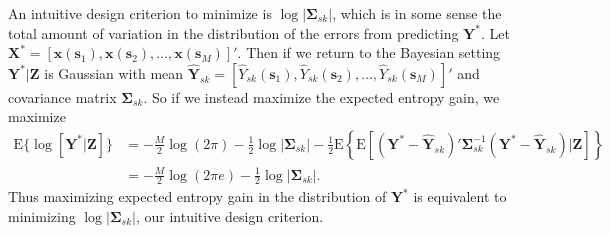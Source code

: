 \documentclass[12pt]{article}
\newcommand{\E}{\mathrm{E}}
\begin{document}
An intuitive design criterion to minimize is $\log|\bm{\Sigma}_{sk}|$, which is in some sense the total amount of variation in the distribution of the errors from predicting $\bm{Y}^*$. Let $\bm{X}^* = [\bm{x}(\bm{s}_1), \bm{x}(\bm{s}_2), \dots, \bm{x}(\bm{s}_M)]'$. Then if we return to the Bayesian setting $\bm{Y}^*|\bm{Z}$ is Gaussian with mean $\widehat{\bm{Y}}_{sk} = [\widehat{Y}_{sk}(\bm{s}_1), \widehat{Y}_{sk}(\bm{s}_2), \dots, \widehat{Y}_{sk}(\bm{s}_M)]'$ and covariance matrix $\bm{\Sigma}_{sk}$. So if we instead maximize the expected entropy gain, we maximize
\begin{align*}
\E\{\log[\bm{Y}^*|\bm{Z}]\} &= -\frac{M}{2}\log(2\pi) - \frac{1}{2}\log|\bm{\Sigma}_{sk}| - \frac{1}{2}\E\left\{\E[(\bm{Y}^* - \widehat{\bm{Y}}_{sk})'\bm{\Sigma}_{sk}^{-1}(\bm{Y}^* - \widehat{\bm{Y}}_{sk})|\bm{Z}]\right\}\\
&= -\frac{M}{2}\log(2\pi e) - \frac{1}{2}\log|\bm{\Sigma}_{sk}|.
\end{align*}
Thus maximizing expected entropy gain in the distribution of $\bm{Y}^*$ is equivalent to minimizing $\log|\bm{\Sigma}_{sk}|$, our intuitive design criterion.
\end{document}
